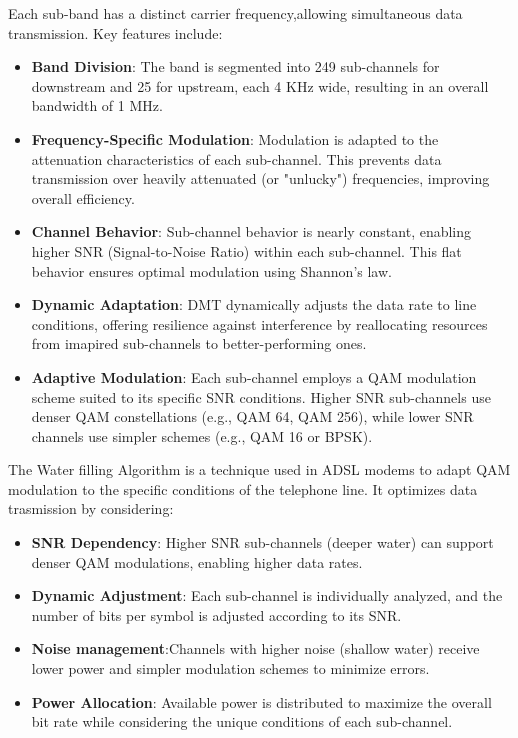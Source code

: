 \documentclass[11pt, a4paper]{article}
\begin{document}
Each sub-band has a distinct carrier frequency,allowing simultaneous data transmission. Key features include:
\begin{itemize}
    \item \textbf{Band Division}: The band is segmented into 249 sub-channels for downstream and 25 for upstream, each 4 KHz wide, resulting in an overall bandwidth of 1 MHz.
    \item \textbf{Frequency-Specific Modulation}: Modulation is adapted to the attenuation characteristics of each sub-channel. This prevents data transmission over heavily attenuated (or "unlucky") frequencies, improving overall efficiency.
    \item \textbf{Channel Behavior}:  Sub-channel behavior is nearly constant, enabling higher SNR (Signal-to-Noise Ratio) within each sub-channel. This flat behavior ensures optimal modulation using Shannon's law.
    \item \textbf{Dynamic Adaptation}: DMT dynamically adjusts the data rate to line conditions, offering resilience against interference by reallocating resources from imapired sub-channels to better-performing ones.
    \item \textbf{Adaptive Modulation}:  Each sub-channel employs a QAM modulation scheme suited to its specific SNR conditions. Higher SNR sub-channels use denser QAM constellations (e.g., QAM 64, QAM 256), while lower SNR channels use simpler schemes (e.g., QAM 16 or BPSK).
\end{itemize}
The Water filling Algorithm is a technique used in ADSL modems to adapt QAM modulation to the specific conditions of the telephone line. It optimizes data trasmission by considering:
\begin{itemize}
    \item \textbf{SNR Dependency}: Higher SNR sub-channels (deeper water) can support denser QAM modulations, enabling higher data rates.
    \item \textbf{Dynamic Adjustment}: Each sub-channel is individually analyzed, and the number of bits per symbol is adjusted according to its SNR.
    \item \textbf{Noise management}:Channels with higher noise (shallow water) receive lower power and simpler modulation schemes to minimize errors.
    \item \textbf{Power Allocation}: Available power is distributed to maximize the overall bit rate while considering the unique conditions of each sub-channel.
\end{itemize}
\end{document}
